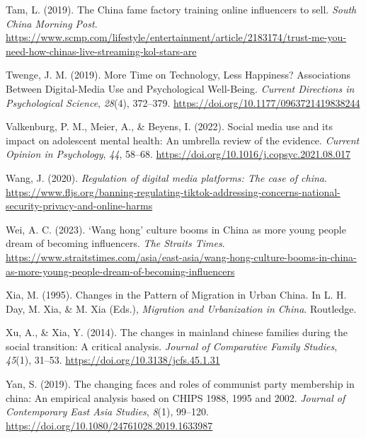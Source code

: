 \documentclass[]{interact}
\theoremstyle{plain}%
\theoremstyle{definition}
\theoremstyle{remark}
\newlength{\cslhangindent}
\newenvironment{CSLReferences}[2] %
 {\begin{list}{}{%
  \setlength{\itemindent}{0pt}
  \setlength{\leftmargin}{0pt}
  \setlength{\parsep}{0pt}
  \ifodd #1
   \setlength{\leftmargin}{\cslhangindent}
   \setlength{\itemindent}{-1\cslhangindent}
  \fi
  \setlength{\itemsep}{#2\baselineskip}}}
 {\end{list}}
\begin{document}
\begin{CSLReferences}{1}{0}
Tam, L. (2019). The China fame factory training online influencers to
sell. \emph{South China Morning Post}.
\url{https://www.scmp.com/lifestyle/entertainment/article/2183174/trust-me-you-need-how-chinas-live-streaming-kol-stars-are}

Twenge, J. M. (2019). More Time on Technology, Less Happiness?
Associations Between Digital-Media Use and Psychological Well-Being.
\emph{Current Directions in Psychological Science}, \emph{28}(4),
372--379. \url{https://doi.org/10.1177/0963721419838244}

Valkenburg, P. M., Meier, A., \& Beyens, I. (2022). Social media use and
its impact on adolescent mental health: An umbrella review of the
evidence. \emph{Current Opinion in Psychology}, \emph{44}, 58--68.
\url{https://doi.org/10.1016/j.copsyc.2021.08.017}

Wang, J. (2020). \emph{Regulation of digital media platforms: The case
of china}.
\url{https://www.fljs.org/banning-regulating-tiktok-addressing-concerns-national-security-privacy-and-online-harms}

Wei, A. C. (2023). {`}Wang hong{'} culture booms in China as more young
people dream of becoming influencers. \emph{The Straits Times}.
\url{https://www.straitstimes.com/asia/east-asia/wang-hong-culture-booms-in-china-as-more-young-people-dream-of-becoming-influencers}

Xia, M. (1995). Changes in the {Pattern} of {Migration} in {Urban}
{China}. In L. H. Day, M. Xia, \& M. Xia (Eds.), \emph{Migration and
{Urbanization} in {China}}. Routledge.

Xu, A., \& Xia, Y. (2014). The changes in mainland chinese families
during the social transition: A critical analysis. \emph{Journal of
Comparative Family Studies}, \emph{45}(1), 31--53.
\url{https://doi.org/10.3138/jcfs.45.1.31}

Yan, S. (2019). The changing faces and roles of communist party
membership in china: An empirical analysis based on CHIPS 1988, 1995 and
2002. \emph{Journal of Contemporary East Asia Studies}, \emph{8}(1),
99--120. \url{https://doi.org/10.1080/24761028.2019.1633987}

\end{CSLReferences}
\end{document}
